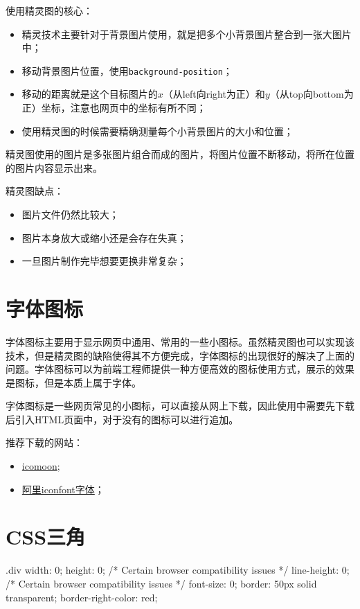 使用精灵图的核心：
\begin{itemize}
    \item 精灵技术主要针对于背景图片使用，就是把多个小背景图片整合到一张大图片中；
    \item 移动背景图片位置，使用\verb|background-position|；
    \item 移动的距离就是这个目标图片的$x$（从left向right为正）和$y$（从top向bottom为正）坐标，注意也网页中的坐标有所不同；
    \item 使用精灵图的时候需要精确测量每个小背景图片的大小和位置；
\end{itemize}

精灵图使用的图片是多张图片组合而成的图片，将图片位置不断移动，将所在位置的图片内容显示出来。

精灵图缺点：
\begin{itemize}
    \item 图片文件仍然比较大；
    \item 图片本身放大或缩小还是会存在失真；
    \item 一旦图片制作完毕想要更换非常复杂；
\end{itemize}
\section{字体图标}
字体图标主要用于显示网页中通用、常用的一些小图标。虽然精灵图也可以实现该技术，但是精灵图的缺陷使得其不方便完成，字体图标的出现很好的解决了上面的问题。字体图标可以为前端工程师提供一种方便高效的图标使用方式，展示的效果是图标，但是本质上属于字体。

字体图标是一些网页常见的小图标，可以直接从网上下载，因此使用中需要先下载后引入HTML页面中，对于没有的图标可以进行追加。

推荐下载的网站：
\begin{itemize}
    \item \href{http://icomoon.io}{icomoon};
    \item \href{http://www.iconfont.cn/}{阿里iconfont字体}；
\end{itemize}
\section{CSS三角}
\begin{css}
    .div {
    width: 0;
    height: 0;
    /* Certain browser compatibility issues */
    line-height: 0;
    /* Certain browser compatibility issues */
    font-size: 0;
    border: 50px solid transparent;
    border-right-color: red;
    }
\end{css}
